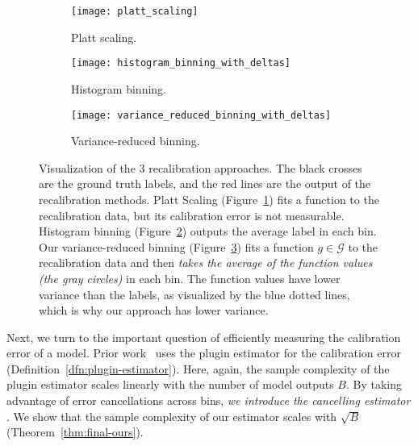 \begin{figure}
     \centering
     \begin{subfigure}[b]{0.32\textwidth}
         \centering
         \texttt{[image: platt\_scaling]}
         \caption{Platt scaling.}
         \label{fig:platt_scaling}
     \end{subfigure}
     \hfill
     \begin{subfigure}[b]{0.32\textwidth}
         \centering
         \texttt{[image: histogram\_binning\_with\_deltas]}
         \caption{Histogram binning.}
         \label{fig:hist_binning}
     \end{subfigure}
     \hfill
     \begin{subfigure}[b]{0.32\textwidth}
         \centering
         \texttt{[image: variance\_reduced\_binning\_with\_deltas]}
         \caption{Variance-reduced binning.}
         \label{fig:var_red_binning}
     \end{subfigure}
        \caption{
        Visualization of the 3 recalibration approaches.
        The black crosses are the ground truth labels, and the red lines are the output of the recalibration methods.
        Platt Scaling (Figure~\ref{fig:platt_scaling}) fits a function to the recalibration data, but its calibration error is not measurable.
        Histogram binning (Figure~\ref{fig:hist_binning}) outputs the average label in each bin.
        Our variance-reduced binning (Figure~\ref{fig:var_red_binning}) fits a function $g \in \mathcal{G}$ to the recalibration data and then \emph{takes the average of the function values (the gray circles)} in each bin.
        The function values have lower variance than the labels, as visualized by the blue dotted lines, which is why our approach has lower variance. 
        }
        \label{fig:variance_reduced_illustration}
\end{figure}

Next, we turn to the important question of efficiently measuring the calibration error of a model.
Prior work~\cite{nguyen2015posterior, guo2017calibration, hendrycks2019anomaly, kuleshov2015calibrated, hendrycks2019pretraining} uses the plugin  estimator for the calibration error (Definition~\ref{dfn:plugin-estimator}).
Here, again, the sample complexity of the plugin estimator scales linearly with the number of model outputs $B$.
By taking advantage of error cancellations across bins, \emph{we introduce the cancelling  estimator} .
We show that the sample complexity of our estimator scales with $\sqrt{B}$ (Theorem~\ref{thm:final-ours}).

